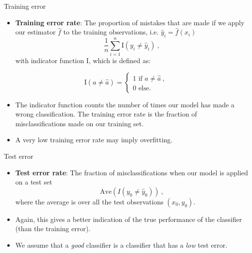 \documentclass[10pt,ignorenonframetext,]{beamer}
\providecommand{\tightlist}{%
  \setlength{\itemsep}{0pt}\setlength{\parskip}{0pt}}
\begin{document}
\begin{frame}

\begin{block}{Training error}

\begin{itemize}
\tightlist
\item
  \textbf{Training error rate}: The proportion of mistakes that are made
  if we apply our estimator \(\hat{f}\) to the training observations,
  i.e. \(\hat{y}_i=\hat{f}(x_i)\)
  \[\frac{1}{n}\sum_{i=1}^n \text{I}(y_i \neq \hat{y}_i) \ ,\] with
  indicator function I, which is defined as:
\end{itemize}

\[\text{I}(a\neq\hat{a}) = \begin{cases} 1 \text{ if } a \neq \hat{a} \ , \\ 
0 \text{ else. } \end{cases}\]

\begin{itemize}
\item
  The indicator function counts the number of times our model has made a
  wrong classification. The training error rate is the fraction of
  misclassifications made on our training set.
\item
  A very low training error rate may imply overfitting.
\end{itemize}

\end{block}

\end{frame}

\begin{frame}

\begin{block}{Test error}

\begin{itemize}
\item
  \textbf{Test error rate}: The fraction of misclassifications when our
  model is applied on a test set
  \[\text{Ave}(I(y_0\neq \hat{y}_0)) \ ,\] where the average is over all
  the test observations \((x_0,y_0)\).
\item
  Again, this gives a better indication of the true performance of the
  classifier (than the training error).
\item
  We assume that a \emph{good} classifier is a classifier that has a
  \emph{low} test error.
\end{itemize}

\end{block}

\end{frame}
\end{document}
